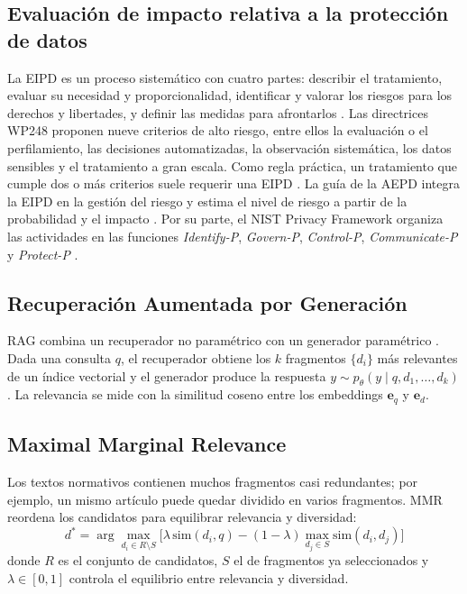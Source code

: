 \documentclass[conference]{IEEEtran}
\begin{document}
\subsection{Evaluación de impacto relativa a la protección de datos}
La EIPD es un proceso sistemático con cuatro partes: describir el tratamiento, evaluar su necesidad y proporcionalidad, identificar y valorar los riesgos para los derechos y libertades, y definir las medidas para afrontarlos \cite{rgpd2016,wp248}. Las directrices WP248 proponen nueve criterios de alto riesgo, entre ellos la evaluación o el perfilamiento, las decisiones automatizadas, la observación sistemática, los datos sensibles y el tratamiento a gran escala. Como regla práctica, un tratamiento que cumple dos o más criterios suele requerir una EIPD \cite{wp248}. La guía de la AEPD integra la EIPD en la gestión del riesgo y estima el nivel de riesgo a partir de la probabilidad y el impacto \cite{aepd2021}. Por su parte, el NIST Privacy Framework organiza las actividades en las funciones \emph{Identify-P}, \emph{Govern-P}, \emph{Control-P}, \emph{Communicate-P} y \emph{Protect-P} \cite{nist2020pf}.

\subsection{Recuperación Aumentada por Generación}
RAG combina un recuperador no paramétrico con un generador paramétrico \cite{lewis2020rag}. Dada una consulta $q$, el recuperador obtiene los $k$ fragmentos $\{d_i\}$ más relevantes de un índice vectorial y el generador produce la respuesta $y \sim p_\theta(y \mid q, d_1,\dots,d_k)$. La relevancia se mide con la similitud coseno entre los embeddings $\mathbf{e}_q$ y $\mathbf{e}_{d}$.

\subsection{Maximal Marginal Relevance}
Los textos normativos contienen muchos fragmentos casi redundantes; por ejemplo, un mismo artículo puede quedar dividido en varios fragmentos. MMR \cite{carbonell1998mmr} reordena los candidatos para equilibrar relevancia y diversidad:
\begin{equation}
d^{*} = \arg\max_{d_i \in R\setminus S}\Big[\lambda\,\mathrm{sim}(d_i,q) - (1-\lambda)\max_{d_j\in S}\mathrm{sim}(d_i,d_j)\Big]
\end{equation}
donde $R$ es el conjunto de candidatos, $S$ el de fragmentos ya seleccionados y $\lambda\in[0,1]$ controla el equilibrio entre relevancia y diversidad.
\end{document}
